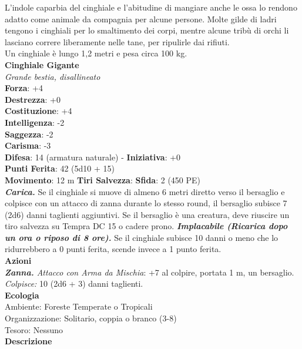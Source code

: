 \begin{multicols}{2}
L'indole caparbia del cinghiale e l'abitudine di mangiare anche le ossa lo rendono adatto come animale da compagnia per alcune persone. Molte gilde di ladri tengono i cinghiali per lo smaltimento dei corpi, mentre alcune tribù di orchi li lasciano correre liberamente nelle tane, per ripulirle dai rifiuti.\\

Un cinghiale è lungo 1,2 metri e pesa circa 100 kg.\\


\medskip\textbf{Cinghiale Gigante}\\
\emph{Grande bestia, disallineato}\\
\textbf{Forza}: +4\\
\textbf{Destrezza}: +0\\
\textbf{Costituzione}: +4\\
\textbf{Intelligenza}: -2\\
\textbf{Saggezza}: -2\\
\textbf{Carisma}: -3\\
\textbf{Difesa}: 14 (armatura naturale) - \textbf{Iniziativa}: +0\\
\textbf{Punti Ferita}: 42 (5d10 + 15)\\
\textbf{Movimento}: 12 m
\textbf{Tiri Salvezza}:
\textbf{Sfida}: 2 (450 PE)\smallskip\\
\emph{\textbf{Carica.}} Se il cinghiale si muove di almeno 6 metri diretto verso il bersaglio e colpisce con un attacco di zanna durante lo stesso round, il bersaglio subisce 7 (2d6) danni taglienti aggiuntivi. Se il bersaglio è una creatura, deve riuscire un tiro salvezza su Tempra DC  15 o cadere prono.
\emph{\textbf{Implacabile (Ricarica dopo un ora o riposo di 8 ore).}} Se il cinghiale subisce 10 danni o meno che lo ridurrebbero a 0 punti ferita, scende invece a 1 punto ferita.\\
\smallskip\textbf{Azioni}\\
\emph{\textbf{Zanna.} Attacco con Arma da Mischia}: +7 al colpire, portata 1 m, un bersaglio.\\
\emph{Colpisce:} 10 (2d6 + 3) danni taglienti.\\
\textbf{Ecologia}\\
Ambiente: Foreste Temperate o Tropicali\\
Organizzazione: Solitario, coppia o branco (3-8)\\
Tesoro: Nessuno\\
\textbf{Descrizione}\\


\end{multicols}
